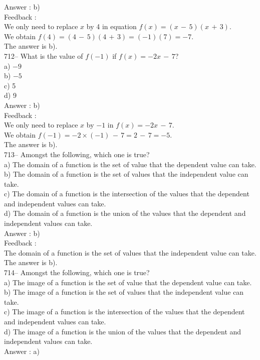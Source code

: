 \documentclass[letterpaper, 12pt]{article}
\begin{document}
Answer : b)\\

Feedback : \\
We only need to replace $x$ by 4 in equation
$f(x)=(x\,-\,5)(x\,+\,3)$.\\
We obtain $f(4)=(4\,-\,5)(4\,+\,3)=(-1)(7)=-7$.\\
The answer is b).\\

712-- What is the value of $f(-1)$ if $f(x)=-2x\,-\,7$?\\
a) $-9$\\
b) $-5$\\
c) 5\\
d) 9\\

Answer : b)\\

Feedback : \\
We only need to replace $x$ by $-1$ in $f(x)=-2x\,-\,7$.\\
We obtain $f(-1)=-2\times(-1)\,-\,7=2\,-\,7=-5$.\\
The answer is b).\\

713--  Amongst the following, which one is true?\\
a) The domain of a function is the set of value that the dependent value can take.\\
b) The domain of a function is the set of values that the independent value can take.\\
c) The domain of a function is the intersection of the values that the dependent and independent values can take.\\
d) The domain of a function is the union of the values that the dependent and independent values can take.\\

Answer : b)\\

Feedback : \\
The domain of a function is the set of values that the independent value can take.
The answer is b).\\

714--  Amongst the following, which one is true?\\
a) The image of a function is the set of value that the dependent value can take.\\
b) The image of a function is the set of values that the independent value can take.\\
c) The image of a function is the intersection of the values that the dependent and independent values can take.\\
d) The image of a function is the union of the values that the dependent and independent values can take.\\
Answer : a)\\
\end{document}

